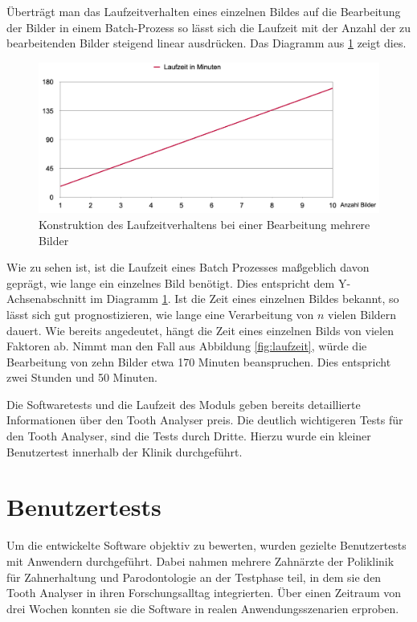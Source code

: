 Überträgt man das Laufzeitverhalten eines einzelnen Bildes auf die Bearbeitung
der Bilder in einem Batch-Prozess so lässt sich die Laufzeit mit der Anzahl der
zu bearbeitenden Bilder steigend linear ausdrücken. Das Diagramm aus \ref{fig:laufzeit_batch}
zeigt dies.

\begin{figure}[h]
	\centering
	\includegraphics[width=1\textwidth]{img/runtimeBatch.png}
	\caption{Konstruktion des Laufzeitverhaltens bei einer Bearbeitung mehrere
	Bilder}
	\label{fig:laufzeit_batch}
\end{figure}

Wie zu sehen ist, ist die Laufzeit eines Batch Prozesses maßgeblich davon geprägt,
wie lange ein einzelnes Bild benötigt. Dies entspricht dem Y-Achsenabschnitt im Diagramm
\ref{fig:laufzeit_batch}. Ist die Zeit eines einzelnen Bildes bekannt, so lässt sich
gut prognostizieren, wie lange eine Verarbeitung von $n$ vielen Bildern dauert. Wie
bereits angedeutet, hängt die Zeit eines einzelnen Bilds von vielen Faktoren ab.
Nimmt man den Fall aus Abbildung \ref{fig:laufzeit}, würde die Bearbeitung von
zehn Bilder etwa 170 Minuten beanspruchen. Dies entspricht zwei Stunden und 50 Minuten.

Die Softwaretests und die Laufzeit des Moduls geben bereits detaillierte Informationen
über den Tooth Analyser preis. Die deutlich wichtigeren Tests für den Tooth
Analyser, sind die Tests durch Dritte. Hierzu wurde ein kleiner Benutzertest
innerhalb der Klinik durchgeführt.

\section{Benutzertests}
\label{sec:benutzertests}Um die entwickelte Software objektiv zu bewerten,
wurden gezielte Benutzertests mit Anwendern durchgeführt. Dabei nahmen mehrere Zahnärzte
der Poliklinik für Zahnerhaltung und Parodontologie an der Testphase teil, in
dem sie den Tooth Analyser in ihren Forschungsalltag integrierten. Über einen Zeitraum
von drei Wochen konnten sie die Software in realen Anwendungsszenarien erproben.

